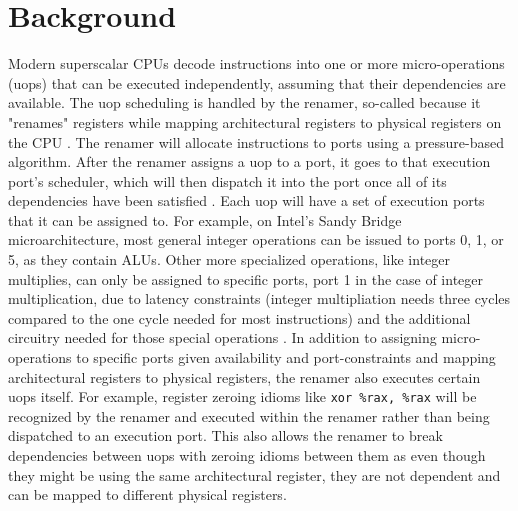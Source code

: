 \documentclass[sigconf]{acmart}
\begin{document}
\section{Background}

Modern superscalar CPUs decode instructions into one or more micro-operations (uops) that can be executed
independently, assuming that their dependencies are available. The uop scheduling is handled by the renamer,
so-called because it "renames" registers while mapping architectural registers to physical registers on the CPU
\cite{abel2022uica} \cite{fog2023architecture}. The renamer will allocate instructions to ports using a pressure-based
algorithm. After the renamer assigns a uop to a port, it goes to that execution port's scheduler, which will then
dispatch it into the port once all of its dependencies have been satisfied \cite{abel2022uica}. Each uop will have a set
of execution ports that it can be assigned to. For example, on Intel's Sandy Bridge microarchitecture, most general
integer operations can be issued to ports 0, 1, or 5, as they contain ALUs. Other more specialized operations, like
integer multiplies, can only be assigned to specific ports, port 1 in the case of integer multiplication, due to
latency constraints (integer multipliation needs three cycles compared to the one cycle needed for most instructions)
and the additional circuitry needed for those special operations \cite{fog2023architecture}. In addition to assigning
micro-operations to specific ports given availability and port-constraints and mapping architectural registers to
physical registers, the renamer also executes certain uops itself. For example, register zeroing idioms like
\texttt{xor \%rax, \%rax} will be recognized by the renamer and executed within the renamer rather than being
dispatched to an execution port. This also allows the renamer to break dependencies between uops with zeroing
idioms between them as even though they might be using the same architectural register, they are not dependent
and can be mapped to different physical registers.
\end{document}
